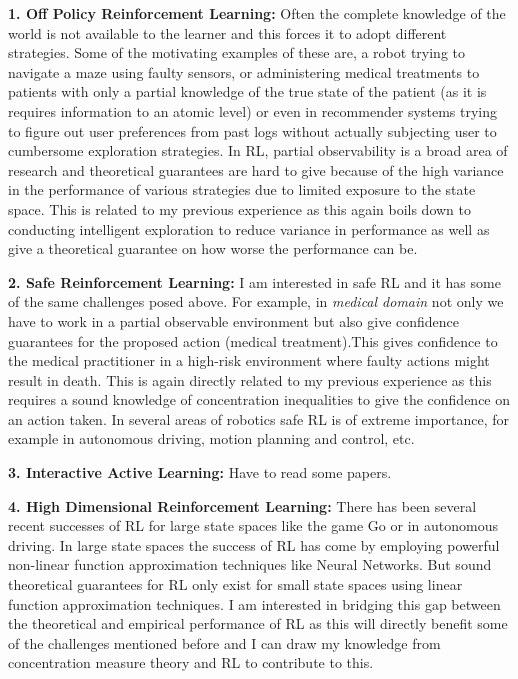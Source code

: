 \documentclass[twoside]{article}
\begin{document}
\textbf{1. Off Policy Reinforcement Learning:} Often the complete knowledge of the world is not available to the learner and this forces it to adopt different strategies. Some of the motivating examples of these are, a robot trying to navigate a maze using faulty sensors, or administering medical treatments to patients with only a partial knowledge of the true state of the patient (as it is requires information to an atomic level) or even in recommender systems trying to figure out user preferences from past logs without actually subjecting user to cumbersome exploration strategies. In RL,  partial observability is a broad area of research and theoretical guarantees are hard to give because of the high variance in the performance of various strategies due to limited exposure to the state space. This is related to my previous experience as this again boils down to conducting intelligent exploration to reduce variance in  performance as well as give a theoretical guarantee on how worse the performance can be.


\textbf{2. Safe Reinforcement Learning:} I am interested in safe RL and it has some of the same challenges posed above. For example, in \textit{medical domain} not only we have to work in a partial observable environment but also give confidence guarantees for the proposed action (medical treatment).This gives confidence to the medical practitioner in a high-risk environment where faulty actions might result in death. This is again directly related to my previous experience as this requires a sound knowledge of concentration inequalities to give the confidence on an action taken. In several areas of robotics safe RL is of extreme importance, for example in autonomous driving, motion planning and control, etc.


\textbf{3. Interactive Active Learning:}  Have to read some papers.


\textbf{4. High Dimensional Reinforcement Learning:} There has been several recent successes of RL for large state spaces like the game Go or in autonomous driving. In large state spaces the success of RL has come by employing powerful non-linear function approximation techniques like Neural Networks. But sound theoretical guarantees for RL only exist for small state spaces using linear function approximation techniques. I am interested in bridging this gap between the theoretical and empirical performance of RL as this will directly benefit some of the challenges mentioned before and I can draw my knowledge from concentration measure theory and RL to contribute to this.
\end{document}

